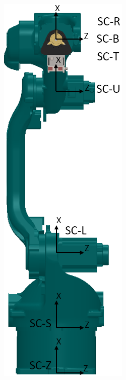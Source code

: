 \begin{figure}[h]
\begin{subfigure}[b]{0.20\textwidth}
        \includegraphics[width=\textwidth]{figs/sc_front}

\end{subfigure}
\end{figure}
